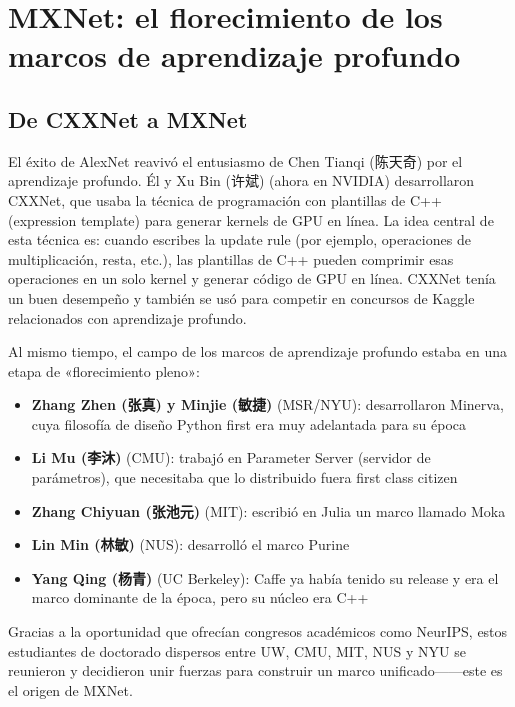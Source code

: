 \section{MXNet: el florecimiento de los marcos de aprendizaje profundo}

\subsection{De CXXNet a MXNet}

El éxito de AlexNet reavivó el entusiasmo de Chen Tianqi (陈天奇) por el aprendizaje profundo. Él y Xu Bin (许斌) (ahora en NVIDIA) desarrollaron CXXNet, que usaba la técnica de programación con plantillas de C++ (expression template) para generar kernels de GPU en línea. La idea central de esta técnica es: cuando escribes la update rule (por ejemplo, operaciones de multiplicación, resta, etc.), las plantillas de C++ pueden comprimir esas operaciones en un solo kernel y generar código de GPU en línea. CXXNet tenía un buen desempeño y también se usó para competir en concursos de Kaggle relacionados con aprendizaje profundo.

Al mismo tiempo, el campo de los marcos de aprendizaje profundo estaba en una etapa de «florecimiento pleno»:

\begin{itemize}
    \item \textbf{Zhang Zhen (张真) y Minjie (敏捷)} (MSR/NYU): desarrollaron Minerva, cuya filosofía de diseño Python first era muy adelantada para su época
    \item \textbf{Li Mu (李沐)} (CMU): trabajó en Parameter Server (servidor de parámetros), que necesitaba que lo distribuido fuera first class citizen
    \item \textbf{Zhang Chiyuan (张池元)} (MIT): escribió en Julia un marco llamado Moka
    \item \textbf{Lin Min (林敏)} (NUS): desarrolló el marco Purine
    \item \textbf{Yang Qing (杨青)} (UC Berkeley): Caffe ya había tenido su release y era el marco dominante de la época, pero su núcleo era C++
\end{itemize}

Gracias a la oportunidad que ofrecían congresos académicos como NeurIPS, estos estudiantes de doctorado dispersos entre UW, CMU, MIT, NUS y NYU se reunieron y decidieron unir fuerzas para construir un marco unificado------este es el origen de MXNet.

